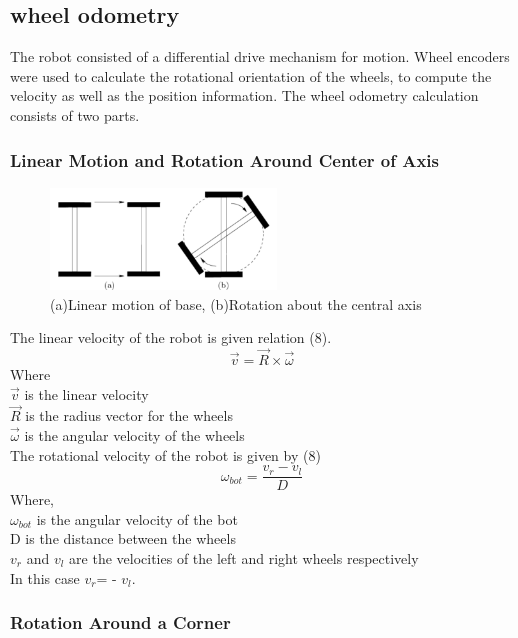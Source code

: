 \documentclass[conference]{IEEEtran}
\begin{document}
\subsection{wheel odometry}
The robot consisted of a differential drive mechanism for motion. Wheel encoders were used to calculate the rotational orientation of the wheels, to compute the velocity as well as the position information. The wheel odometry calculation consists of two parts.
\subsubsection{Linear Motion and Rotation Around Center of Axis}
\begin{figure}[h]
\includegraphics[width=6cm]{linearandrot.png}
\centering
\caption{(a)Linear motion of base, (b)Rotation about the central axis}\label{net_img}
\end{figure}
The linear velocity of the robot is given relation (8).
\begin{equation} \label{eq:9}
\vec{v}=\vec{R}\times \vec{\omega}
\end{equation}
Where\\
$\vec{v}$ is the linear velocity\\
$\vec{R}$ is the radius vector for the wheels\\
$\vec{\omega}$ is the angular velocity of the wheels\\
The rotational velocity of the robot is given by (8)\\
\begin{equation} \label{eq:10}
\omega_{bot}=\frac{v_r-v_l}{D}
\end{equation}
Where,\\
$\omega_{bot}$ is the angular velocity of the bot\\
D is the distance between the wheels\\
$v_r$ and $v_l$ are the velocities of the left and right wheels respectively\\

In this case $v_r$= - $v_l$.
\subsubsection{Rotation Around a Corner}
\end{document}
